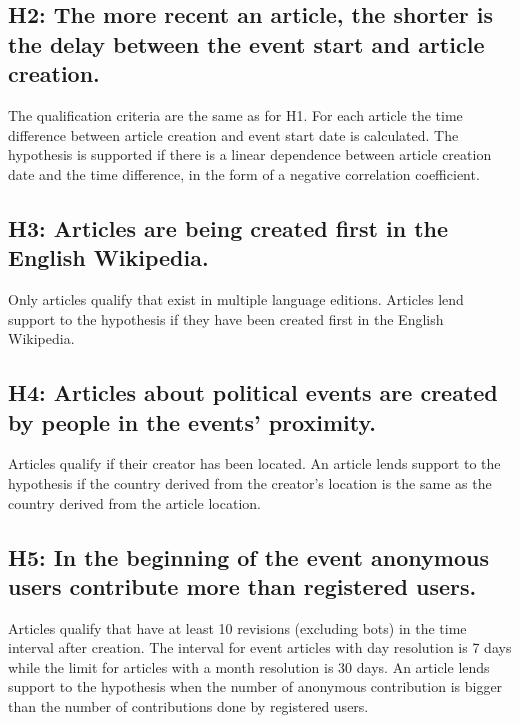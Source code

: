 \subsection*{H2: The more recent an article, the shorter is the delay between the event start and article creation.}

The qualification criteria are the same as for H1. 
For each article the time difference between article creation and event start date is calculated. 
The hypothesis is supported if there is a linear dependence between article creation date and the time difference, in the form of a negative correlation coefficient.

\subsection*{H3: Articles are being created first in the English Wikipedia.}

Only articles qualify that exist in multiple language editions.
Articles lend support to the hypothesis if they have been created first in the English Wikipedia.

\subsection*{H4: Articles about political events are created by people in the events' proximity.}

Articles qualify if their creator has been located.
An article lends support to the hypothesis if the country derived from the creator's location is the same as the country derived from the article location.


\subsection*{H5: In the beginning of the event anonymous users contribute more than registered users.}

Articles qualify that have at least 10 revisions (excluding bots) in the time interval after creation.
The interval for event articles with day resolution is 7 days while the limit for articles with a month resolution is 30 days.
An article lends support to the hypothesis when the number of anonymous contribution is bigger than the number of contributions done by registered users.

